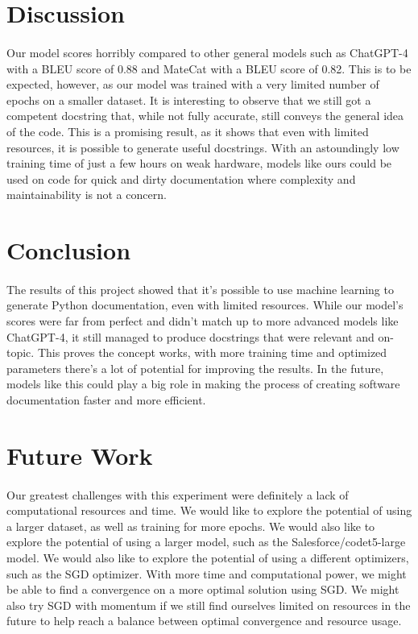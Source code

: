 \documentclass[12pt]{article}
\begin{document}
	\section{Discussion}
	\paragraph{} Our model scores horribly compared to other general models such as ChatGPT-4 with a BLEU score of 0.88 and MateCat with a BLEU score of 0.82. \cite{ghassemiazghandi2024evaluation} This is to be expected, however, as our model was trained with a very limited number of epochs on a smaller dataset. It is interesting to observe that we still got a competent docstring that, while not fully accurate, still conveys the general idea of the code. This is a promising result, as it shows that even with limited resources, it is possible to generate useful docstrings. With an astoundingly low training time of just a few hours on weak hardware, models like ours could be used on code for quick and dirty documentation where complexity and maintainability is not a concern.

	\section{Conclusion}
	\paragraph{} The results of this project showed that it's possible to use machine learning to generate Python documentation, even with limited resources. While our model's scores were far from perfect and didn't match up to more advanced models like ChatGPT-4, it still managed to produce docstrings that were relevant and on-topic. This proves the concept works, with more training time and optimized parameters there's a lot of potential for improving the results. In the future, models like this could play a big role in making the process of creating software documentation faster and more efficient.

	\section{Future Work}
	\paragraph{} Our greatest challenges with this experiment were definitely a lack of computational resources and time. We would like to explore the potential of using a larger dataset, as well as training for more epochs. We would also like to explore the potential of using a larger model, such as the Salesforce/codet5-large model. We would also like to explore the potential of using a different optimizers, such as the SGD optimizer. With more time and computational power, we might be able to find a convergence on a more optimal solution using SGD. We might also try SGD with momentum if we still find ourselves limited on resources in the future to help reach a balance between optimal convergence and resource usage.
\end{document}

